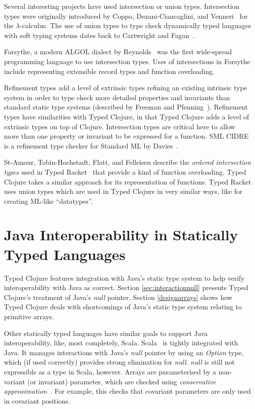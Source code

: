 Several interesting projects have used intersection or union types.
Intersection types were originally introduced by Coppo, Dezani-Ciancaglini, and Venneri~\cite{CDV81}
for the $\lambda$-calculus.
The use of union types to type check dynamically typed languages with soft typing systems
dates back to Cartwright and Fagan~\cite{CF91}.

Forsythe, a modern ALGOL dialect by Reynolds~\cite{Rey81,Rey96} was the first wide-spread 
programming language to use intersection types.
Uses of intersections in Forsythe include representing extensible record types
and function overloading.

Refinement types add a level of extrinsic types refining an existing intrinsic type system
in order to type check more detailed properties and invariants than standard static type systems
(described by Freeman and Pfenning~\cite{FP91}).
Refinement types have similarities with Typed Clojure, in that Typed Clojure
adds a level of extrinsic types on top of Clojure.
Intersection types are critical here to allow more than one property or invariant
to be expressed for a function.
SML CIDRE is a refinement type checker for Standard ML by Davies~\cite{Dav05}.

St-Amour, Tobin-Hochstadt, Flatt, and Felleisen
describe the \emph{ordered intersection types} used in Typed Racket~\cite{St12}
that provide a kind of function overloading.
Typed Clojure takes a similar approach for its representation of functions.
Typed Racket uses union types which are used in Typed Clojure in very similar ways,
like for creating ML-like ``datatypes''.

\section{Java Interoperability in Statically Typed Languages}

Typed Clojure features integration with Java's static type system
to help verify interoperability with Java as correct.
Section \ref{sec:interactionnull} presents Typed Clojure's treatment of
Java's \emph{null} pointer. 
Section \ref{designarrays} shows how Typed Clojure deals with shortcomings
of Java's static type system relating to primitive arrays.

Other statically typed languages have similar goals
to support Java interoperability, like, most completely, Scala.
Scala~\cite{OCD+} is tightly integrated with Java. It manages interactions
with Java's \emph{null} pointer by using an \emph{Option} type, which (if
used correctly) provides strong elimination for \emph{null}.
\emph{null} is still not expressible as a type in Scala, however.
Arrays are parameterised by a non-variant (or invariant) parameter,
which are checked using \emph{conservative approximation}~\cite{OSV08}. For example,
this checks that covariant parameters are only used in covariant positions.

